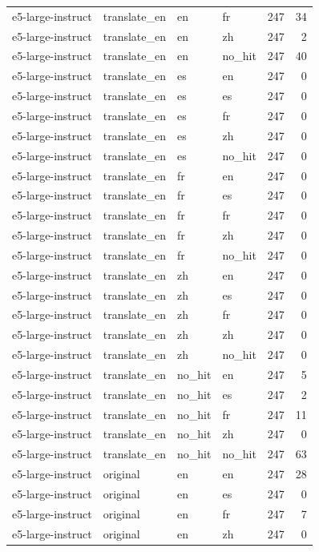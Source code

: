 \begin{tabular}{llllrr}
e5-large-instruct & translate\_en & en & fr & 247 & 34 \\
e5-large-instruct & translate\_en & en & zh & 247 & 2 \\
e5-large-instruct & translate\_en & en & no\_hit & 247 & 40 \\
e5-large-instruct & translate\_en & es & en & 247 & 0 \\
e5-large-instruct & translate\_en & es & es & 247 & 0 \\
e5-large-instruct & translate\_en & es & fr & 247 & 0 \\
e5-large-instruct & translate\_en & es & zh & 247 & 0 \\
e5-large-instruct & translate\_en & es & no\_hit & 247 & 0 \\
e5-large-instruct & translate\_en & fr & en & 247 & 0 \\
e5-large-instruct & translate\_en & fr & es & 247 & 0 \\
e5-large-instruct & translate\_en & fr & fr & 247 & 0 \\
e5-large-instruct & translate\_en & fr & zh & 247 & 0 \\
e5-large-instruct & translate\_en & fr & no\_hit & 247 & 0 \\
e5-large-instruct & translate\_en & zh & en & 247 & 0 \\
e5-large-instruct & translate\_en & zh & es & 247 & 0 \\
e5-large-instruct & translate\_en & zh & fr & 247 & 0 \\
e5-large-instruct & translate\_en & zh & zh & 247 & 0 \\
e5-large-instruct & translate\_en & zh & no\_hit & 247 & 0 \\
e5-large-instruct & translate\_en & no\_hit & en & 247 & 5 \\
e5-large-instruct & translate\_en & no\_hit & es & 247 & 2 \\
e5-large-instruct & translate\_en & no\_hit & fr & 247 & 11 \\
e5-large-instruct & translate\_en & no\_hit & zh & 247 & 0 \\
e5-large-instruct & translate\_en & no\_hit & no\_hit & 247 & 63 \\
e5-large-instruct & original & en & en & 247 & 28 \\
e5-large-instruct & original & en & es & 247 & 0 \\
e5-large-instruct & original & en & fr & 247 & 7 \\
e5-large-instruct & original & en & zh & 247 & 0 \\

\end{tabular}
